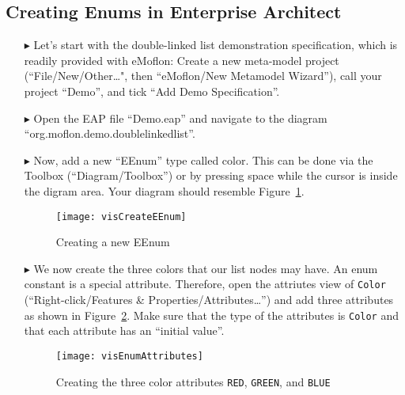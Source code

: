 \newpage
\hypertarget{enums vis}{}
\subsection{Creating Enums in Enterprise Architect}
\visHeader

\begin{itemize}

\item[$\blacktriangleright$]
Let's start with the double-linked list demonstration specification, which is
readily provided with eMoflon:
Create a new meta-model project (``File/New/Other\dots", then ``eMoflon/New
Metamodel Wizard''), call your project ``Demo'', and tick ``Add Demo
Specification''.

\item[$\blacktriangleright$]
Open the EAP file ``Demo.eap'' and navigate to the diagram
``org.\-moflon.\-demo.\-doublelinkedlist''.

\item[$\blacktriangleright$]
Now, add a new ``EEnum'' type called color.
This can be done via the Toolbox (``Diagram/Toolbox'') or by pressing space
while the cursor is inside the digram area.
Your diagram should resemble Figure~\ref{enums:vis:createEEnum}.

\begin{figure}[htbp]
    \begin{center} 
        \texttt{[image: visCreateEEnum]}
        \caption{Creating a new EEnum}  
        \label{enums:vis:createEEnum}
    \end{center}
\end{figure}

\item[$\blacktriangleright$]
We now create the three colors that our list nodes may have.
An enum constant is a special attribute.
Therefore, open the attriutes view of \texttt{Color} (``Right-click/Features \&
Properties/Attributes\dots'') and add three attributes as shown in
Figure~\ref{enums:vis:enumAttributes}.
Make sure that the type of the attributes is \texttt{Color} and that each
attribute has an ``initial value''.

\begin{figure}[htbp]
    \begin{center} 
        \texttt{[image: visEnumAttributes]}
        \caption{Creating the three color attributes \texttt{RED},
        \texttt{GREEN}, and \texttt{BLUE}}
        \label{enums:vis:enumAttributes}
    \end{center}
\end{figure}


\end{itemize}
